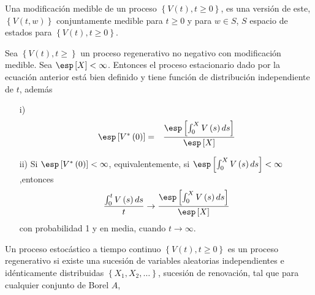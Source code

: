 \begin{Def}
Una modificaci\'on medible de un proceso $\left\{V\left(t\right),t\geq0\right\}$, es una versi\'on de este, $\left\{V\left(t,w\right)\right\}$ conjuntamente medible para $t\geq0$ y para $w\in S$, $S$ espacio de estados para $\left\{V\left(t\right),t\geq0\right\}$.
\end{Def}

\begin{Teo}
Sea $\left\{V\left(t\right),t\geq\right\}$ un proceso regenerativo no negativo con modificaci\'on medible. Sea $\esp\left[X\right]<\infty$. Entonces el proceso estacionario dado por la ecuaci\'on anterior est\'a bien definido y tiene funci\'on de distribuci\'on independiente de $t$, adem\'as
\begin{itemize}
\item[i)] \begin{eqnarray*}
\esp\left[V^{*}\left(0\right)\right]&=&\frac{\esp\left[\int_{0}^{X}V\left(s\right)ds\right]}{\esp\left[X\right]}\end{eqnarray*}
\item[ii)] Si $\esp\left[V^{*}\left(0\right)\right]<\infty$, equivalentemente, si $\esp\left[\int_{0}^{X}V\left(s\right)ds\right]<\infty$,entonces
\begin{eqnarray*}
\frac{\int_{0}^{t}V\left(s\right)ds}{t}\rightarrow\frac{\esp\left[\int_{0}^{X}V\left(s\right)ds\right]}{\esp\left[X\right]}
\end{eqnarray*}
con probabilidad 1 y en media, cuando $t\rightarrow\infty$.
\end{itemize}
\end{Teo}
%




Un proceso estoc\'astico a tiempo continuo $\left\{V\left(t\right),t\geq0\right\}$ es un proceso regenerativo si existe una sucesi\'on de variables aleatorias independientes e id\'enticamente distribuidas $\left\{X_{1},X_{2},\ldots\right\}$, sucesi\'on de renovaci\'on, tal que para cualquier conjunto de Borel $A$, 

